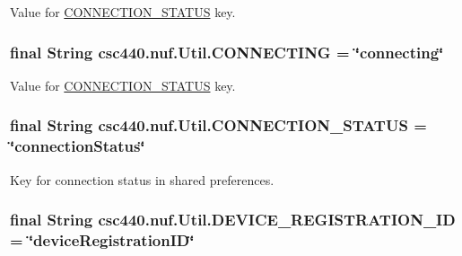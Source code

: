 Value for \hyperlink{classcsc440_1_1nuf_1_1_util_ae827ff85c7a597b88b411a982eb41ad7}{C\-O\-N\-N\-E\-C\-T\-I\-O\-N\-\_\-\-S\-T\-A\-T\-U\-S} key. \hypertarget{classcsc440_1_1nuf_1_1_util_a5d1dcaf2bd94bf0d3e20aa24db16f7b3}{
\subsubsection[{C\-O\-N\-N\-E\-C\-T\-I\-N\-G}]{\setlength{\rightskip}{0pt plus 5cm}final String {\bf csc440.\-nuf.\-Util.\-C\-O\-N\-N\-E\-C\-T\-I\-N\-G} = \char`\"{}connecting\char`\"{}}}\label{classcsc440_1_1nuf_1_1_util_a5d1dcaf2bd94bf0d3e20aa24db16f7b3}
Value for \hyperlink{classcsc440_1_1nuf_1_1_util_ae827ff85c7a597b88b411a982eb41ad7}{C\-O\-N\-N\-E\-C\-T\-I\-O\-N\-\_\-\-S\-T\-A\-T\-U\-S} key. \hypertarget{classcsc440_1_1nuf_1_1_util_ae827ff85c7a597b88b411a982eb41ad7}{
\subsubsection[{C\-O\-N\-N\-E\-C\-T\-I\-O\-N\-\_\-\-S\-T\-A\-T\-U\-S}]{\setlength{\rightskip}{0pt plus 5cm}final String {\bf csc440.\-nuf.\-Util.\-C\-O\-N\-N\-E\-C\-T\-I\-O\-N\-\_\-\-S\-T\-A\-T\-U\-S} = \char`\"{}connection\-Status\char`\"{}}}\label{classcsc440_1_1nuf_1_1_util_ae827ff85c7a597b88b411a982eb41ad7}
Key for connection status in shared preferences. \hypertarget{classcsc440_1_1nuf_1_1_util_a19e590891af91bcb18ce096826a637d9}{
\subsubsection[{D\-E\-V\-I\-C\-E\-\_\-\-R\-E\-G\-I\-S\-T\-R\-A\-T\-I\-O\-N\-\_\-\-I\-D}]{\setlength{\rightskip}{0pt plus 5cm}final String {\bf csc440.\-nuf.\-Util.\-D\-E\-V\-I\-C\-E\-\_\-\-R\-E\-G\-I\-S\-T\-R\-A\-T\-I\-O\-N\-\_\-\-I\-D} = \char`\"{}device\-Registration\-I\-D\char`\"{}}}\label{classcsc440_1_1nuf_1_1_util_a19e590891af91bcb18ce096826a637d9}
